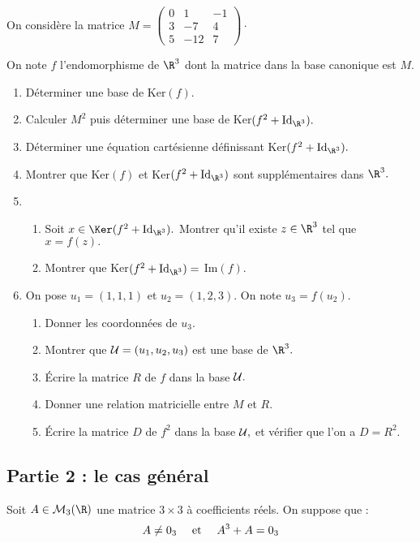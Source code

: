\documentclass[twoside,french,11pt]{VcCours}
\begin{document}
On considère la matrice $M=\left(\begin{array}{rrr}
  0 & 1 & -1\\
  3 & -7 & 4\\
  5 & -12 & 7 \end{array}\right) \cdot$
  
\medskip  
  On note $f$ l'endomorphisme de $\R^3$ dont la matrice dans la base canonique est $M.$
  \begin{enumerate}
    \item Déterminer une base de Ker$(f).$
    \item Calculer $M^2$ puis déterminer une base de Ker$(f^2+{\rm Id}_{\R^3}).$
    \item Déterminer une équation cartésienne définissant  Ker$(f^2+{\rm Id}_{\R^3}).$
    \item  Montrer que Ker$(f)$ et  Ker$(f^2+{\rm Id}_{\R^3})$ sont supplémentaires dans $\R^3.$
    \item
    \begin{enumerate}
      \item Soit $x\in\Ker(f^2+{\rm Id}_{\R^3}).$ Montrer qu'il existe $z\in \R^3$ tel que $x=f(z).$
      \item Montrer que  Ker$(f^2+{\rm Id}_{\R^3})=$ Im$(f).$
    \end{enumerate}
    \item On pose $u_1=(1,1,1)$ et $u_2=(1,2,3)$. On note $u_3=f(u_2).$
    \begin{enumerate}
      \item Donner les coordonnées de $u_3.$
      \item Montrer que ${\cal U}=(u_1,u_2,u_3)$ est une base de $\R^3.$
      \item Écrire la matrice $R$ de $f$ dans la base ${\cal U}.$
      \item Donner une relation matricielle entre $M$ et $R.$
      \item Écrire la matrice $D$ de $f^2$ dans la base ${\cal U},$ et vérifier que l'on a $D=R^2.$
    \end{enumerate}
  \end{enumerate}

  \subsection*{Partie 2 : le cas général}

  Soit $A\in{\cal M}_3(\R)$ une matrice $3\times 3$ à coefficients réels. On suppose que :
  $$A\neq 0_3\quad \hbox{ et } \quad A^3+A=0_3$$
\end{document}
